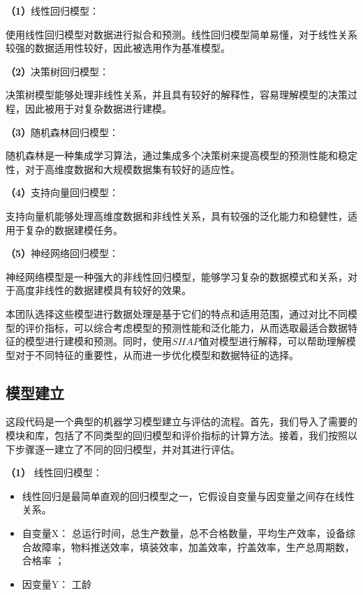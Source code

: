 \documentclass[withoutpreface,bwprint]{cumcmthesis}
\begin{document}
\textbf{（1）}线性回归模型：

使用线性回归模型对数据进行拟合和预测。线性回归模型简单易懂，对于线性关系较强的数据适用性较好，因此被选用作为基准模型。

\textbf{（2）}决策树回归模型：

决策树模型能够处理非线性关系，并且具有较好的解释性，容易理解模型的决策过程，因此被用于对复杂数据进行建模。

\textbf{（3）}随机森林回归模型：

随机森林是一种集成学习算法，通过集成多个决策树来提高模型的预测性能和稳定性，对于高维度数据和大规模数据集有较好的适应性。

\textbf{（4）}支持向量回归模型：

支持向量机能够处理高维度数据和非线性关系，具有较强的泛化能力和稳健性，适用于复杂的数据建模任务。

\textbf{（5）}神经网络回归模型：

神经网络模型是一种强大的非线性回归模型，能够学习复杂的数据模式和关系，对于高度非线性的数据建模具有较好的效果。

本团队选择这些模型进行数据处理是基于它们的特点和适用范围，通过对比不同模型的评价指标，可以综合考虑模型的预测性能和泛化能力，从而选取最适合数据特征的模型进行建模和预测。同时，使用\(SHAP\)值对模型进行解释，可以帮助理解模型对于不同特征的重要性，从而进一步优化模型和数据特征的选择。

\subsection{模型建立}

这段代码是一个典型的机器学习模型建立与评估的流程。首先，我们导入了需要的模块和库，包括了不同类型的回归模型和评价指标的计算方法。接着，我们按照以下步骤逐一建立了不同的回归模型，并对其进行评估。

\textbf{（1）} 线性回归模型：

\begin{itemize}
    \item 线性回归是最简单直观的回归模型之一，它假设自变量与因变量之间存在线性关系。
    
    \item 自变量X：{ 总运行时间，总生产数量，总不合格数量，平均生产效率，设备综合故障率，物料推送效率，填装效率，加盖效率，拧盖效率，生产总周期数，合格率 }；
    
    \item 因变量Y：{ 工龄 }
\end{itemize}
\end{document}
